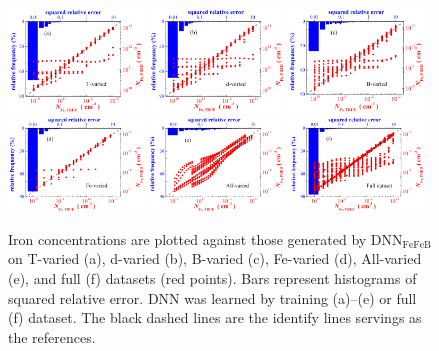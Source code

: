 \documentclass[num-refs]{wiley-article} %
\begin{document}
\begin{figure}[tb]
\centering
\includegraphics[width=0.32\textwidth]{F3a}
\includegraphics[width=0.32\textwidth]{F3b}
\includegraphics[width=0.32\textwidth]{F3c}
\includegraphics[width=0.32\textwidth]{F3d}
\includegraphics[width=0.32\textwidth]{F3e}
\includegraphics[width=0.32\textwidth]{F3f}
\caption{Iron concentrations are plotted against those generated by DNN$_\mathrm{FeFeB}$
on  T-varied (a),
d-varied (b),
B-varied (c),
Fe-varied (d),
All-varied (e),
and full (f) datasets (red points).
Bars represent histograms of squared relative error.
DNN was learned by training (a)--(e) or full (f) dataset.
The black dashed lines are the identify lines servings as the references.}
\label{fig_TrDNN1}
\end{figure}
\end{document}
